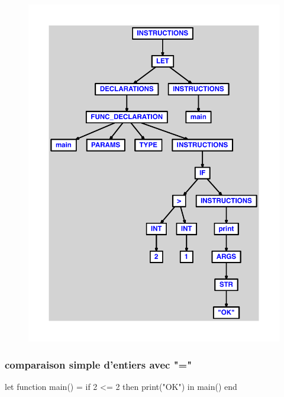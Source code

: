 \documentclass{article}
\begin{document}
\begin{figure}[H]\centering\includegraphics[max width=\textwidth]{ast/ast_168.pdf}\end{figure}\subsubsection{comparaison simple d'entiers avec "="}
\begin{verbatimtab}
let
	function main() =
		if 2 <= 2 then print("OK")
in main() end
\end{verbatimtab}
\end{document}
